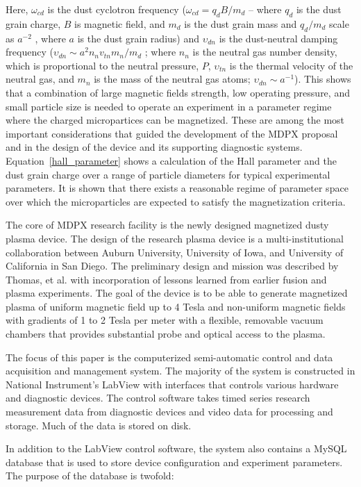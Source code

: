 Here, $\omega_{cd}$ is the dust cyclotron frequency ($\omega_{cd} = q_d B / m_d$ – where $q_d$ is the dust grain charge, $B$ is magnetic field, and $m_d$ is the dust grain mass and $q_d / m_d$ scale as $a^{-2}$ , where $a$ is the dust grain radius) and $\upsilon_{dn}$ is the dust-neutral damping frequency ($\upsilon_{dn} \sim a^2 n_n v_{tn} m_n / m_d$ ; where $n_n$ is the neutral gas number density, which is proportional to the neutral pressure, $P$, $\upsilon_{tn}$ is the thermal velocity of the neutral gas, and $m_n$ is the mass of the neutral gas atoms; $\upsilon_{dn} \sim a^{-1}$). This shows that a combination of large magnetic fields strength, low operating pressure, and small particle size is needed to operate an experiment in a parameter regime where the charged micropartices can be magnetized. These are among the most important considerations that guided the development of the MDPX proposal and in the design of the device and its supporting diagnostic systems. Equation~\ref{hall_parameter} shows a calculation of the Hall parameter and the dust grain charge over a range of particle diameters for typical experimental parameters. It is shown that there exists a reasonable regime of parameter space over which the microparticles are expected to satisfy the magnetization criteria.

The core of MDPX research facility is the newly designed magnetized dusty plasma device. The design of the research plasma device is a multi-institutional collaboration between Auburn University, University of Iowa, and University of California in San Diego. The preliminary design and mission was described by Thomas, et al. with incorporation of lessons learned from earlier fusion and plasma experiments. The goal of the device is to be able to generate magnetized plasma of uniform magnetic field up to 4 Tesla and non-uniform magnetic fields with gradients of 1 to 2 Tesla per meter with a flexible, removable vacuum chambers that provides substantial probe and optical access to the plasma\cite{PLA:9579370}.

The focus of this paper is the computerized semi-automatic control and data acquisition and management system. The majority of the system is constructed in National Instrument's LabView with interfaces that controls various hardware and diagnostic devices. The control software takes timed series research measurement data from diagnostic devices and video data for processing and storage. Much of the data is stored on disk.

In addition to the LabView control software, the system also contains a MySQL database that is used to store device configuration and experiment parameters. The purpose of the database is twofold:

